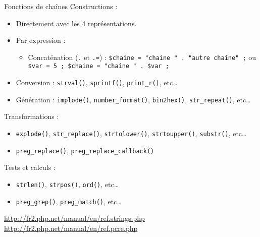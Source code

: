 \begin{frame}[containsverbatim]{Fonctions de chaînes}
	Constructions :
	\begin{itemize}
		\item Directement avec les 4 représentations.
		\item Par expression :
		\begin{itemize}
			\item Concaténation (\texttt{.} et \texttt{.=}) : \lstinline~$chaine = "chaine " . "autre chaine" ;~ ou \lstinline~$var = 5 ; $chaine = "chaine " . $var ;~
		\end{itemize}
		\item Conversion : \lstinline~strval()~, \lstinline~sprintf()~, \lstinline~print_r()~, etc\ldots
		\item Génération : \lstinline~implode()~, \lstinline~number_format()~, \lstinline~bin2hex()~, \lstinline~str_repeat()~, etc\ldots
	\end{itemize}
	Transformations :
	\begin{itemize}
		\item \lstinline~explode()~, \lstinline~str_replace()~, \lstinline~strtolower()~, \lstinline~strtoupper()~, \lstinline~substr()~, etc\ldots
		\item \lstinline~preg_replace()~, \lstinline~preg_replace_callback()~
	\end{itemize}
		Tests et calculs :
	\begin{itemize}
		\item \lstinline~strlen()~, \lstinline~strpos()~, \lstinline~ord()~, etc\ldots
		\item \lstinline~preg_grep()~, \lstinline~preg_match()~, etc\ldots
	\end{itemize}
	\url{http://fr2.php.net/manual/en/ref.strings.php}\\
	\url{http://fr2.php.net/manual/en/ref.pcre.php}\\
\end{frame}
